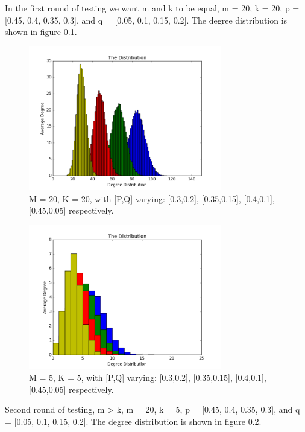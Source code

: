 \documentclass[paper=a4, fontsize=11pt]{scrartcl}
\numberwithin{equation}{section}		%
\numberwithin{figure}{section}			%
\numberwithin{table}{section}				%
\begin{document}
In the first round of testing we want m and k to be equal, m = 20, k = 20, p = [0.45, 0.4, 0.35, 0.3], and q = [0.05, 0.1, 0.15, 0.2]. The degree distribution is shown in figure 0.1.

\begin{figure}[h]
\center
\caption{M = 20, K = 20, with [P,Q] varying: [0.3,0.2], [0.35,0.15], [0.4,0.1], [0.45,0.05] respectively.}
\includegraphics[width=0.75\textwidth]{pictures/m=k.png}
\end{figure}

\begin{figure}[h]
\center
\caption{M = 5, K = 5, with [P,Q] varying: [0.3,0.2], [0.35,0.15], [0.4,0.1], [0.45,0.05] respectively.}
\includegraphics[width=0.75\textwidth]{pictures/k=m.png}
\end{figure}

Second round of testing, m > k, m = 20, k = 5, p = [0.45, 0.4, 0.35, 0.3], and q = [0.05, 0.1, 0.15, 0.2]. The degree distribution is shown in figure 0.2.
\end{document}
